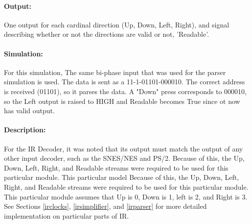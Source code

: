 \documentclass[]{article}
\begin{document}
\paragraph{Output:} One output for each cardinal direction (Up, Down, Left, Right), and signal describing whether or not the directions are valid or not, 'Readable'.
\paragraph{Simulation:} For this simulation, The same bi-phase input that was used for the parser simulation is used. The data is sent as a 11-1-01101-000010.
The correct address is received (01101), so it parses the data. A "Down" press corresponds to 000010, so the Left output is raised to HIGH and Readable becomes True since ot now has valid output.
\paragraph{Description:} For the IR Decoder, it was noted that its output must match the output of any other input decoder, such as the SNES/NES and PS/2.
Because of this, the Up, Down, Left, Right, and Readable streams were required to be used for this particular module. This particular model 
Because of this, the Up, Down, Left, Right, and Readable streams were required to be used for this particular module.
This particular module assumes that Up is 0, Down is 1, left is 2, and Right is 3. See Sections \ref{irclocks}, \ref{irsimplifier},
and \ref{irparser} for more detailed implementation on particular parts of IR.
\end{document}
